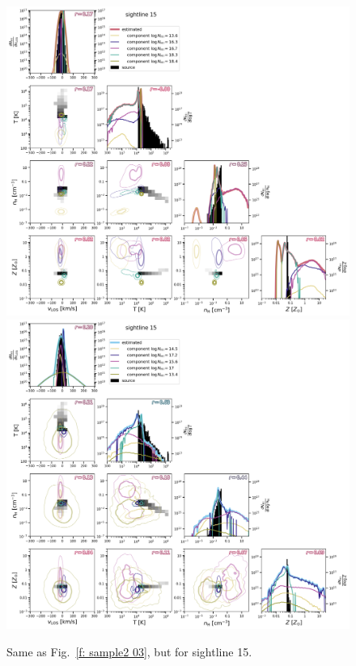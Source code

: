 \documentclass[fleqn,usenatbib]{mnras}
\begin{document}
\begin{figure}
    \centering
    \includegraphics[height=0.45\textheight]{figures/sample2/original/sightline_0015.png}
    \includegraphics[height=0.45\textheight]{figures/sample2/high-z/sightline_0015.png}
    \label{f: sample2 15 corner}
    \caption{Same as Fig.~\ref{f: sample2 03}, but for sightline 15.}
\end{figure}
\end{document}
